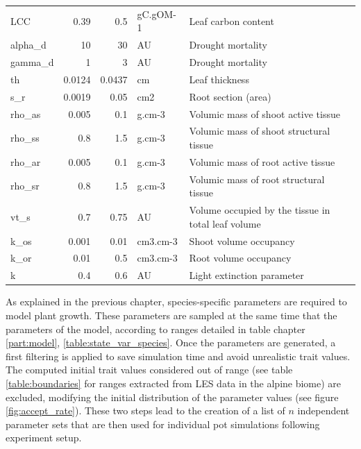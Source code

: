 \begin{table2*}
\begin{tabular}{lrrll}
LCC         & 0.39    & 0.5    & gC.gOM-1                     & Leaf carbon content                                \\
alpha\_d    & 10      & 30     & AU                           & Drought mortality                                  \\
gamma\_d    & 1       & 3      & AU                           & Drought mortality                                  \\
th          & 0.0124  & 0.0437 & cm                           & Leaf thickness                                     \\
s\_r        & 0.0019  & 0.05   & cm2                          & Root section (area)                                \\
rho\_as     & 0.005   & 0.1    & g.cm-3                       & Volumic mass of shoot active tissue                \\
rho\_ss     & 0.8     & 1.5    & g.cm-3                       & Volumic mass of shoot structural tissue            \\
rho\_ar     & 0.005   & 0.1    & g.cm-3                       & Volumic mass of root active tissue                 \\
rho\_sr     & 0.8     & 1.5    & g.cm-3                       & Volumic mass of root structural tissue             \\
vt\_s       & 0.7     & 0.75   & AU                           & Volume occupied by the tissue in total leaf volume \\
k\_os       & 0.001   & 0.01   & cm3.cm-3                     & Shoot volume occupancy                             \\
k\_or       & 0.01    & 0.5    & cm3.cm-3                     & Root volume occupancy                              \\
k           & 0.4     & 0.6    & AU                           & Light extinction parameter                        
\end{tabular}
\vspace*{0.5cm}
\end{table2*}

As explained in the previous chapter, species-specific parameters are required to model plant growth. These parameters are sampled at the same time that the parameters of the model, according to ranges detailed in table chapter \ref{part:model}, \ref{table:state_var_species}. Once the parameters are generated, a first filtering is applied to save simulation time and avoid unrealistic trait values. The computed initial trait values considered out of range (see table \ref{table:boundaries} for ranges extracted from LES data \parencite{wright_worldwide_2004} in the alpine biome) are excluded, modifying the initial distribution of the parameter values (see figure \ref{fig:accept_rate}). These two steps lead to the creation of a list of $n$ independent parameter sets that are then used for individual pot simulations following \citet{peterson_growth_1982} experiment setup.
\\

